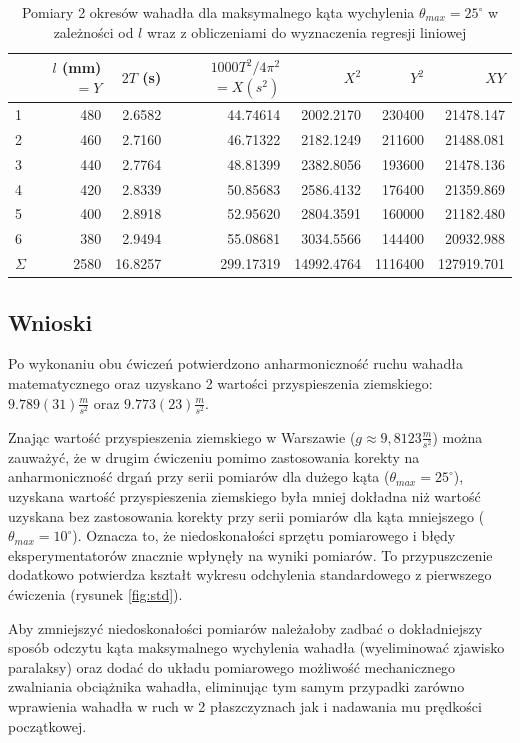 \documentclass[a4paper]{article}
\newlength{\du}
\begin{document}
\begin{table}[h]
\centering

	\begin{tabular}{lrrrrrr}
	\toprule
		{} & $l$ (mm) $=Y$ &  $2T$ (s) & \small$1000T^2/4\pi^2$\normalsize$=X (s^2)$ & $X^2$ & $Y^2$ & $XY$ \\
	\midrule
	1 &     480 &  2.6582 &  44.74614 &  2002.2170 &  230400 &  21478.147 \\
	2 &     460 &  2.7160 &  46.71322 &  2182.1249 &  211600 &  21488.081 \\
	3 &     440 &  2.7764 &  48.81399 &  2382.8056 &  193600 &  21478.136 \\
	4 &     420 &  2.8339 &  50.85683 &  2586.4132 &  176400 &  21359.869 \\
	5 &     400 &  2.8918 &  52.95620 &  2804.3591 &  160000 &  21182.480 \\
	6 &     380 &  2.9494 &  55.08681 &  3034.5566 &  144400 &  20932.988 \\
	\midrule
	$\Sigma$ & 2580 & 16.8257 & 299.17319& 14992.4764 & 1116400 & 127919.701 \\
	\bottomrule
	\end{tabular}
	
\caption{Pomiary 2 okresów wahadła dla maksymalnego kąta wychylenia $\theta_{max} = 25^\circ$ w  zależności od $l$ wraz z obliczeniami do wyznaczenia regresji liniowej}
\label{pomiary_3}
\end{table}



\subsection{Wnioski}
Po wykonaniu obu ćwiczeń potwierdzono anharmoniczność ruchu wahadła matematycznego oraz uzyskano
2 wartości przyspieszenia ziemskiego: $9.789(31) \tfrac{m}{s^2}$ oraz $9.773(23) \tfrac{m}{s^2}$.

Znając wartość przyspieszenia ziemskiego w Warszawie ($g\approx9,8123 \tfrac{m}{s^2}$)
można zauważyć, że w drugim ćwiczeniu pomimo zastosowania korekty na anharmoniczność drgań
przy serii pomiarów dla dużego kąta ($\theta_{max} = 25^\circ$), uzyskana wartość
przyspieszenia ziemskiego była mniej dokładna niż wartość uzyskana bez zastosowania
korekty przy serii pomiarów dla kąta mniejszego ($\theta_{max} = 10^\circ$).
Oznacza to, że niedoskonałości sprzętu pomiarowego i błędy eksperymentatorów znacznie
wpłynęły na wyniki pomiarów.
To przypuszczenie dodatkowo potwierdza kształt wykresu odchylenia standardowego
z pierwszego ćwiczenia (rysunek \ref{fig:std}).


Aby zmniejszyć niedoskonałości pomiarów należałoby zadbać o dokładniejszy sposób odczytu
kąta maksymalnego wychylenia wahadła (wyeliminować zjawisko paralaksy) oraz dodać do
układu pomiarowego możliwość mechanicznego zwalniania obciążnika wahadła, eliminując tym
samym przypadki zarówno wprawienia wahadła w ruch w 2 płaszczyznach 
jak i nadawania mu prędkości początkowej.
\end{document}
